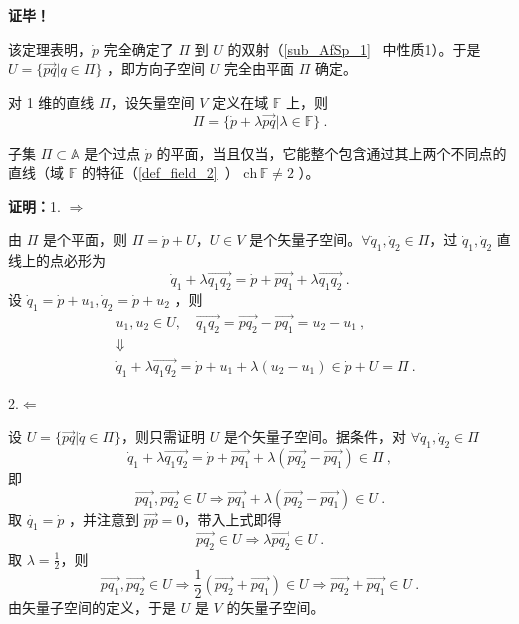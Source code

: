 \textbf{证毕！}

该定理表明，$\dot p$ 完全确定了 $\Pi$ 到 $U$ 的双射（\autoref{sub_AfSp_1}~ 中性质1）。于是 $U=\{\overrightarrow{pq}|q\in \Pi\}$ ，即方向子空间 $U$ 完全由平面 $\Pi$ 确定。

对 1 维的直线 $\Pi$，设矢量空间 $V$ 定义在域 $\mathbb F$ 上，则
\begin{equation}\label{eq_SAfSp_4}
\Pi=\{\dot p+\lambda\overrightarrow{pq}|\lambda\in \mathbb F\}~.
\end{equation}
\begin{theorem}{}
子集 $\Pi \subset\mathbb A$ 是个过点 $\dot p$ 的平面，当且仅当，它能整个包含通过其上两个不同点的直线（域 $\mathbb F$ 的特征（\autoref{def_field_2}~） $\mathrm{ch}\,\mathbb F\neq 2$ ）。
\end{theorem}
\textbf{证明：}1.
$\Rightarrow$

由 $\Pi$ 是个平面，则 $\Pi=\dot p+U$，$U\in V$ 是个矢量子空间。$\forall\dot q_1,\dot q_2\in \Pi$，过 $\dot q_1,\dot q_2$ 直线上的点必形为
\begin{equation}
\dot q_1+\lambda\overrightarrow{q_1q_2}=\dot p+\overrightarrow{pq_1}+\lambda\overrightarrow{q_1q_2}~.
\end{equation}
设 $\dot q_1=\dot p+u_1,\dot q_2=\dot p+u_2$ ，则
\begin{equation}
\begin{aligned}
&u_1,u_2\in U,\quad \overrightarrow{q_1q_2}=\overrightarrow{pq_2}-\overrightarrow{pq_1}=u_2-u_1~,\\
&\Downarrow\\
&\dot q_1+\lambda\overrightarrow{q_1q_2}=\dot p+u_1+\lambda(u_2-u_1)\in\dot p+U=\Pi~.
\end{aligned}
\end{equation}

2.$\Leftarrow$

设 $U=\{\overrightarrow{pq}|\dot q\in \Pi\}$，则只需证明 $U$ 是个矢量子空间。据条件，对 $\forall \dot q_1,\dot q_2\in\Pi$
\begin{equation}
\dot q_1+\lambda\overrightarrow{q_1q_2}=\dot p+\overrightarrow{pq_1}+\lambda(\overrightarrow{pq_2}-\overrightarrow{pq_1})\in\Pi~,
\end{equation}
 即
 \begin{equation}
 \overrightarrow{pq_1},\overrightarrow{pq_2}\in U\Rightarrow \overrightarrow{pq_1}+\lambda(\overrightarrow{pq_2}-\overrightarrow{pq_1})\in U~.
 \end{equation}
 取 $\dot{q_1}=\dot{p}$ ，并注意到 $\overrightarrow{pp}=0$，带入上式即得 
 \begin{equation}\label{eq_SAfSp_2}
 \overrightarrow{pq_2}\in U\Rightarrow\lambda\overrightarrow{pq_2}\in U ~.
 \end{equation}
取 $\lambda=\frac{1}{2}$，则 
\begin{equation}
\overrightarrow{pq_1},\overrightarrow{pq_2}\in U\Rightarrow \frac{1}{2}(\overrightarrow{pq_2}+\overrightarrow{pq_1})\in U\Rightarrow \overrightarrow{pq_2}+\overrightarrow{pq_1}\in U~.
\end{equation}
由矢量子空间的定义，于是 $U$ 是 $V$ 的矢量子空间。

